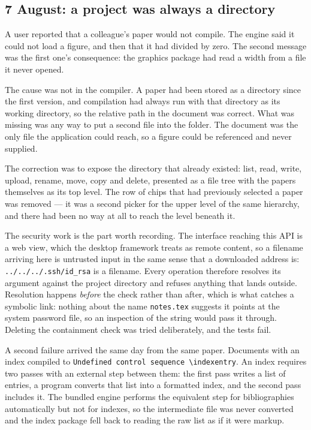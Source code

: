 \documentclass[11pt,a4paper]{article}
\begin{document}
\subsection{7 August: a project was always a directory}

A user reported that a colleague's paper would not compile. The engine said it
could not load a figure, and then that it had divided by zero. The second
message was the first one's consequence: the graphics package had read a width
from a file it never opened.

The cause was not in the compiler. A paper had been stored as a directory since
the first version, and compilation had always run with that directory as its
working directory, so the relative path in the document was correct. What was
missing was any way to put a second file into the folder. The document was the
only file the application could reach, so a figure could be referenced and never
supplied.

The correction was to expose the directory that already existed: list, read,
write, upload, rename, move, copy and delete, presented as a file tree with the
papers themselves as its top level. The row of chips that had previously
selected a paper was removed --- it was a second picker for the upper level of
the same hierarchy, and there had been no way at all to reach the level beneath
it.

The security work is the part worth recording. The interface reaching this API
is a web view, which the desktop framework treats as remote content, so a
filename arriving here is untrusted input in the same sense that a downloaded
address is: \texttt{../../../.ssh/id\_rsa} is a filename. Every operation
therefore resolves its argument against the project directory and refuses
anything that lands outside. Resolution happens \emph{before} the check rather
than after, which is what catches a symbolic link: nothing about the name
\texttt{notes.tex} suggests it points at the system password file, so an
inspection of the string would pass it through. Deleting the containment check
was tried deliberately, and the tests fail.

A second failure arrived the same day from the same paper. Documents with an
index compiled to \texttt{Undefined control sequence \textbackslash indexentry}.
An index requires two passes with an external step between them: the first pass
writes a list of entries, a program converts that list into a formatted index,
and the second pass includes it. The bundled engine performs the equivalent step
for bibliographies automatically but not for indexes, so the intermediate file
was never converted and the index package fell back to reading the raw list as
if it were markup.
\end{document}
